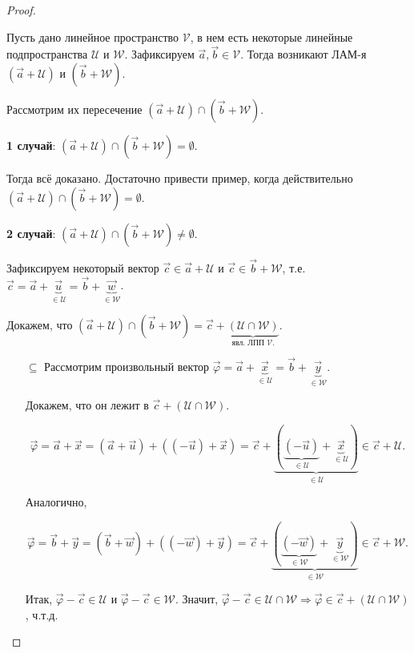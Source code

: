 \begin{proof}~

    Пусть дано линейное пространство $\mathcal{V}$, в нем есть некоторые линейные подпространства $\mathcal{U}$ и $\mathcal{W}$. Зафиксируем $\vec{a}, \vec{b} \in \mathcal{V}$. Тогда возникают ЛАМ-я $(\vec{a} + \mathcal{U})$ и $(\vec{b} + \mathcal{W})$.

    Рассмотрим их пересечение $(\vec{a} + \mathcal{U}) \cap (\vec{b} + \mathcal{W})$.

    \textbf{1 случай}: $(\vec{a} + \mathcal{U}) \cap (\vec{b} + \mathcal{W}) = \emptyset$.

    Тогда всё доказано. Достаточно привести пример, когда действительно $(\vec{a} + \mathcal{U}) \cap (\vec{b} + \mathcal{W}) = \emptyset$.

    \bigbreak

    \textbf{2 случай}: $(\vec{a} + \mathcal{U}) \cap (\vec{b} + \mathcal{W}) \ne \emptyset$.

    Зафиксируем некоторый вектор $\vec{c} \in \vec{a} + \mathcal{U}$ и $\vec{c} \in \vec{b} + \mathcal{W}$, т.е. $\vec{c} = \vec{a} + \underbrace{\vec{u}}_{\in \mathcal{U}} = \vec{b} + \underbrace{\vec{w}}_{\in \mathcal{W}}$.

    Докажем, что $(\vec{a} + \mathcal{U}) \cap (\vec{b} + \mathcal{W}) = \vec{c} + \underbrace{(\mathcal{U} \cap \mathcal{W})}_{\text{явл. ЛПП } \mathcal{V}.}$.

    \begin{enumerate}
        \item[$\subseteq$] Рассмотрим произвольный вектор $\vec{\varphi} = \vec{a} + \underbrace{\vec{x}}_{\in \mathcal{U}} =\vec{b} + \underbrace{\vec{y}}_{\in \mathcal{W}}.$
    
        Докажем, что он лежит в $\vec{c} + (\mathcal{U} \cap \mathcal{W})$.
    
        $$\vec{\varphi} = \vec{a} + \vec{x} = (\vec{a} + \vec{u}) + ((-\vec{u}) + \vec{x}) = \vec{c} + \underbrace{(\underbrace{(-\vec{u})}_{\in \mathcal{U}} + \underbrace{\vec{x}}_{\in \mathcal{U}})}_{\in \mathcal{U}} \in \vec{c} +\mathcal{U}.$$
    
        Аналогично,
    
        $$\vec{\varphi} = \vec{b} + \vec{y} = (\vec{b} + \vec{w}) + ((-\vec{w}) + \vec{y}) = \vec{c} + \underbrace{(\underbrace{(-\vec{w})}_{\in \mathcal{W}} + \underbrace{\vec{y}}_{\in \mathcal{W}})}_{\in \mathcal{W}} \in \vec{c} +\mathcal{W}.$$
    
        Итак, $\vec{\varphi} - \vec{c} \in \mathcal{U}$ и $\vec{\varphi} - \vec{c} \in \mathcal{W}$. Значит, $\vec{\varphi} - \vec{c} \in \mathcal{U} \cap \mathcal{W} \Rightarrow \vec{\varphi} \in \vec{c} + (\mathcal{U} \cap \mathcal{W})$, ч.т.д.
        

\end{enumerate}
\end{proof}
